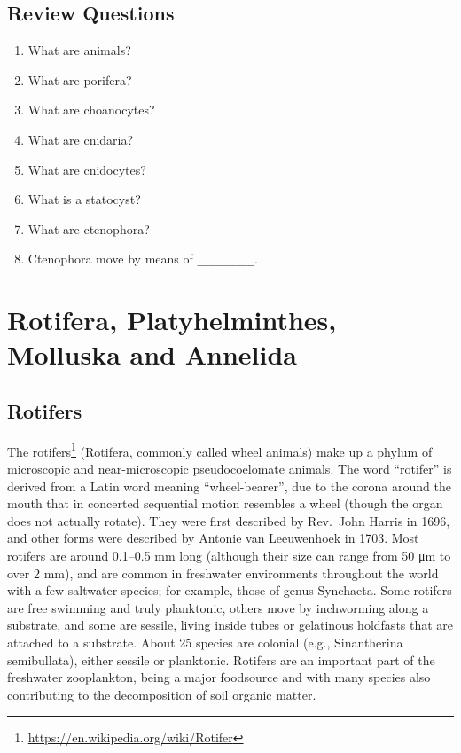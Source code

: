\documentclass[]{book}
\providecommand{\tightlist}{%
  \setlength{\itemsep}{0pt}\setlength{\parskip}{0pt}}
\let\rmarkdownfootnote\footnote%
\def\footnote{\protect\rmarkdownfootnote}
\renewcommand{\href}[2]{#2\footnote{\url{#1}}}
\theoremstyle{definition}
\theoremstyle{definition}
\theoremstyle{definition}
\theoremstyle{remark}
\begin{document}
\section{Review Questions}\label{review-questions-3}

\begin{enumerate}
\def\labelenumi{\arabic{enumi}.}
\tightlist
\item
  What are animals?
\item
  What are porifera?
\item
  What are choanocytes?
\item
  What are cnidaria?
\item
  What are cnidocytes?
\item
  What is a statocyst?
\item
  What are ctenophora?
\item
  Ctenophora move by means of \texttt{\_\_\_\_\_\_\_\_\_}.
\end{enumerate}

\chapter{Rotifera, Platyhelminthes, Molluska and
Annelida}\label{rotifera-platyhelminthes-molluska-and-annelida}

\section{Rotifers}\label{rotifers}

The \href{https://en.wikipedia.org/wiki/Rotifer}{rotifers} (Rotifera,
commonly called wheel animals) make up a phylum of microscopic and
near-microscopic pseudocoelomate animals. The word ``rotifer'' is
derived from a Latin word meaning ``wheel-bearer'', due to the corona
around the mouth that in concerted sequential motion resembles a wheel
(though the organ does not actually rotate). They were first described
by Rev.~John Harris in 1696, and other forms were described by Antonie
van Leeuwenhoek in 1703. Most rotifers are around 0.1--0.5 mm long
(although their size can range from 50 μm to over 2 mm), and are common
in freshwater environments throughout the world with a few saltwater
species; for example, those of genus Synchaeta. Some rotifers are free
swimming and truly planktonic, others move by inchworming along a
substrate, and some are sessile, living inside tubes or gelatinous
holdfasts that are attached to a substrate. About 25 species are
colonial (e.g., Sinantherina semibullata), either sessile or planktonic.
Rotifers are an important part of the freshwater zooplankton, being a
major foodsource and with many species also contributing to the
decomposition of soil organic matter.
\end{document}
